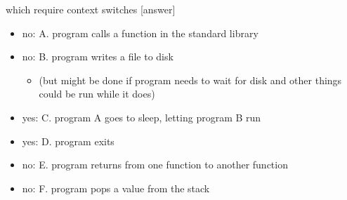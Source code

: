 {\begin{frame}{which require context switches [answer]}
    \begin{itemize}
    \item no: A. program calls a function in the standard library
    \item no: B. program writes a file to disk
        \begin{itemize}
        \item (but might be done if program needs to wait for disk and other things could be run while it does)
        \end{itemize}
    \item yes: C. program A goes to sleep, letting program B run
    \item yes: D. program exits
    \item no: E. program returns from one function to another function
    \item no: F. program pops a value from the stack
    \end{itemize}
\end{frame}
}
